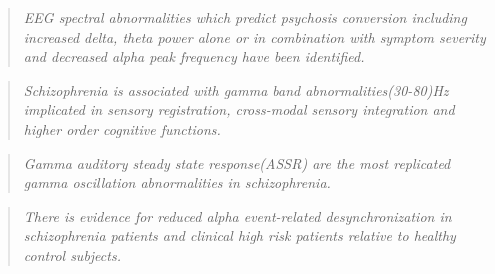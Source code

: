\begin{quotation}
	\textit{EEG spectral abnormalities which predict psychosis conversion including increased delta, theta power alone or in combination with symptom severity and decreased alpha peak frequency have been identified.}
	\begin{flushright}
		\cite{gschwandtner2009eeg}
	\end{flushright}
\end{quotation}
\begin{quotation}
	\textit{Schizophrenia is associated with gamma band abnormalities(30-80)Hz implicated in sensory registration, cross-modal sensory integration and higher order cognitive functions.}
	\begin{flushright}
		\cite{uhlhaas2010abnormal}
	\end{flushright}
\end{quotation}
\begin{quotation}
	\textit{Gamma auditory steady state response(ASSR) are the most replicated gamma oscillation abnormalities in schizophrenia.}
	\begin{flushright}
		\cite{hamilton2020electroencephalography}
	\end{flushright}
\end{quotation}
\begin{quotation}
	\textit{There is evidence for reduced alpha event-related desynchronization in schizophrenia patients and clinical high risk patients relative to healthy control subjects.}
	\begin{flushright}
		\cite{koh2011meg}
	\end{flushright}
\end{quotation}

